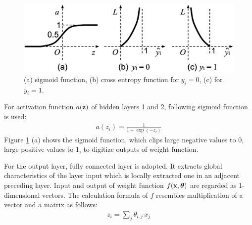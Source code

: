 \documentclass[twocolumn]{article}
\begin{document}
\begin{figure}[!tb]
 \begin{center}
  \begin{minipage}{\hsize}
   \includegraphics[width=\hsize]{fig/curves_03.eps}
   \caption{(a) sigmoid function,
    (b) cross entropy function for $y_i = 0$, (c) for $y_i = 1$.}
   \label{fig:curves}
  \end{minipage}
 \end{center}
\end{figure}

For activation function $a({\bf z})$ of hidden layers 1 and 2,
following sigmoid function is used:
\begin{eqnarray}
a(z_i) = \frac{1}{1+\exp(-z_i)}
\end{eqnarray}
Figure \ref{fig:curves} (a) shows the sigmoid function,
which clips large negative values to 0, large positive values to 1,
to digitize outputs of weight function.

For the output layer, fully connected layer is adopted.
It extracts global characteristics of the layer input
which is locally extracted one in an adjacent preceding layer.
Input and output of weight function 
$f({\bf x}, {\bm \theta})$
are regarded as 1-dimensional vectors.
The calculation formula of $f$ resembles
multiplication of a vector and a matrix as follows:
\begin{eqnarray}
z_i = \sum_{j} \theta_{i,j}\, x_{j}
\end{eqnarray}
\end{document}
